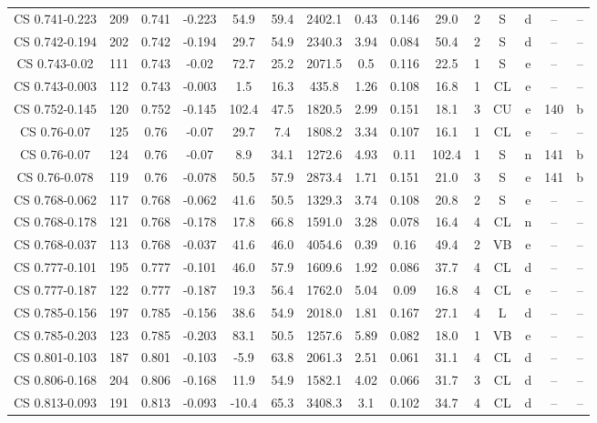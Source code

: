 \begin{table}
\begin{tabular}{ccccccccccccccc}
CS 0.741-0.223 & 209 & 0.741 & -0.223 & 54.9 & 59.4 & 2402.1 & 0.43 & 0.146 & 29.0 & 2 & S & d & -- & -- \\
CS 0.742-0.194 & 202 & 0.742 & -0.194 & 29.7 & 54.9 & 2340.3 & 3.94 & 0.084 & 50.4 & 2 & S & d & -- & -- \\
CS 0.743-0.02 & 111 & 0.743 & -0.02 & 72.7 & 25.2 & 2071.5 & 0.5 & 0.116 & 22.5 & 1 & S & e & -- & -- \\
CS 0.743-0.003 & 112 & 0.743 & -0.003 & 1.5 & 16.3 & 435.8 & 1.26 & 0.108 & 16.8 & 1 & CL & e & -- & -- \\
CS 0.752-0.145 & 120 & 0.752 & -0.145 & 102.4 & 47.5 & 1820.5 & 2.99 & 0.151 & 18.1 & 3 & CU & e & 140 & b \\
CS 0.76-0.07 & 125 & 0.76 & -0.07 & 29.7 & 7.4 & 1808.2 & 3.34 & 0.107 & 16.1 & 1 & CL & e & -- & -- \\
CS 0.76-0.07 & 124 & 0.76 & -0.07 & 8.9 & 34.1 & 1272.6 & 4.93 & 0.11 & 102.4 & 1 & S & n & 141 & b \\
CS 0.76-0.078 & 119 & 0.76 & -0.078 & 50.5 & 57.9 & 2873.4 & 1.71 & 0.151 & 21.0 & 3 & S & e & 141 & b \\
CS 0.768-0.062 & 117 & 0.768 & -0.062 & 41.6 & 50.5 & 1329.3 & 3.74 & 0.108 & 20.8 & 2 & S & e & -- & -- \\
CS 0.768-0.178 & 121 & 0.768 & -0.178 & 17.8 & 66.8 & 1591.0 & 3.28 & 0.078 & 16.4 & 4 & CL & n & -- & -- \\
CS 0.768-0.037 & 113 & 0.768 & -0.037 & 41.6 & 46.0 & 4054.6 & 0.39 & 0.16 & 49.4 & 2 & VB & e & -- & -- \\
CS 0.777-0.101 & 195 & 0.777 & -0.101 & 46.0 & 57.9 & 1609.6 & 1.92 & 0.086 & 37.7 & 4 & CL & d & -- & -- \\
CS 0.777-0.187 & 122 & 0.777 & -0.187 & 19.3 & 56.4 & 1762.0 & 5.04 & 0.09 & 16.8 & 4 & CL & e & -- & -- \\
CS 0.785-0.156 & 197 & 0.785 & -0.156 & 38.6 & 54.9 & 2018.0 & 1.81 & 0.167 & 27.1 & 4 & L & d & -- & -- \\
CS 0.785-0.203 & 123 & 0.785 & -0.203 & 83.1 & 50.5 & 1257.6 & 5.89 & 0.082 & 18.0 & 1 & VB & e & -- & -- \\
CS 0.801-0.103 & 187 & 0.801 & -0.103 & -5.9 & 63.8 & 2061.3 & 2.51 & 0.061 & 31.1 & 4 & CL & d & -- & -- \\
CS 0.806-0.168 & 204 & 0.806 & -0.168 & 11.9 & 54.9 & 1582.1 & 4.02 & 0.066 & 31.7 & 3 & CL & d & -- & -- \\
CS 0.813-0.093 & 191 & 0.813 & -0.093 & -10.4 & 65.3 & 3408.3 & 3.1 & 0.102 & 34.7 & 4 & CL & d & -- & -- \\

\end{tabular}
\end{table}

